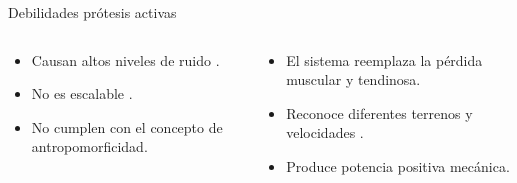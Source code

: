 \documentclass[10pt]{beamer}
\begin{document}
\begin{frame}{Debilidades prótesis activas}

\begin{columns}[t]


\column{60 mm}
\begin{alertblock}{}

\begin{itemize}
\item {\scriptsize{}Causan altos niveles de ruido \cite{boston}.}{\scriptsize \par}
\item {\scriptsize{}No es escalable \cite{BIOMASME}.}{\scriptsize \par}
\item {\scriptsize{}No cumplen con el concepto de antropomorficidad\cite{BIOMASME}.}{\scriptsize \par}
\end{itemize}
\end{alertblock}
\begin{exampleblock}{}

\begin{itemize}
\item {\footnotesize{}El sistema reemplaza la pérdida muscular y tendinosa\cite{Varol2010}. }{\footnotesize \par}
\item {\footnotesize{}Reconoce diferentes terrenos y velocidades \cite{Lawson2011}. }{\footnotesize \par}
\item {\footnotesize{}Produce potencia positiva mecánica\cite{Martinez-Villalpando2009}.}{\footnotesize \par}
\end{itemize}
\end{exampleblock}

\column{60 mm}


\end{columns}
\end{frame}
\end{document}
